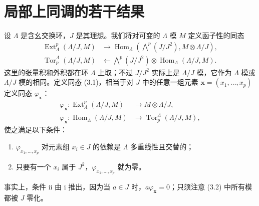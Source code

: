 \section{局部上同调的若干结果}
设 $\Lambda$ 是含幺交换环，$J$ 是其理想。我们将对可变的 $\Lambda$ 模 $M$ 定义函子性的同态
\begin{equation}
\begin{aligned}
\operatorname{Ext}_{\Lambda}^{p}(\Lambda/J,M)
&\longrightarrow\operatorname{Hom}_{\Lambda}
\left(\bigwedge^p(J/J^2),M\otimes\Lambda/J\right),\\
\operatorname{Tor}^{\Lambda}_{p}(\Lambda/J,M)
&\longleftarrow\bigwedge^p(J/J^2)\otimes
\operatorname{Hom}_{\Lambda}(\Lambda/J,M).
\end{aligned}\tag{3.1}
\end{equation}
这里的张量积和外积都在环 $\Lambda$ 上取；不过 $J/J^2$ 实际上是 $\Lambda/J$ 模，它作为 $\Lambda$ 模或 $\Lambda/J$ 模的相同。定义同态 (3.1)，相当于对 $J$ 中的任意一组元素 $\mathbf x=(x_1,\ldots,x_p)$ 定义同态 $\varphi_{\mathbf x}$：
\begin{equation}
\begin{aligned}
\varphi_{\mathbf x}:\operatorname{Ext}_{\Lambda}^{p}(\Lambda/J,M)&\longrightarrow M\otimes\Lambda/J,\\
\varphi_{\mathbf x}:\operatorname{Hom}_{\Lambda}(\Lambda/J,M)&\longrightarrow\operatorname{Tor}^{\Lambda}_{p}(\Lambda/J,M),
\end{aligned}\tag{3.2}
\end{equation}
使之满足以下条件：

\begin{enumerate}[label=\roman*.]
\item $\varphi_{x_1,\ldots,x_p}$ 对元素组 $x_i\in J$ 的依赖是 $\Lambda$ 多重线性且交替的；
\item 只要有一个 $x_i$ 属于 $J^2$，$\varphi_{x_1,\ldots,x_p}$ 就为零。
\end{enumerate}
事实上，条件 ii 由 i 推出，因为当 $a\in J$ 时，$a\varphi_{\mathbf x}=0$；只须注意 (3.2) 中所有模都被 $J$ 零化。

